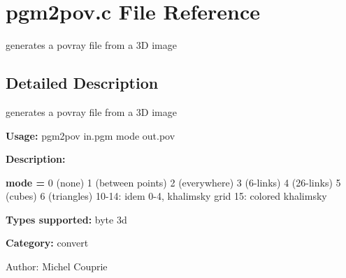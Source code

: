 \section{pgm2pov.c File Reference}
\label{pgm2pov_8c}
generates a povray file from a 3D image 



\subsection{Detailed Description}
generates a povray file from a 3D image 

{\bf Usage:} pgm2pov in.pgm mode out.pov

{\bf Description:}

{\bf mode = } 0 (none) 1 (between points) 2 (everywhere) 3 (6-links) 4 (26-links) 5 (cubes) 6 (triangles) 10-14: idem 0-4, khalimsky grid 15: colored khalimsky

{\bf Types supported:} byte 3d

{\bf Category:} convert

\begin{Desc}
\item[Author:]Michel Couprie \end{Desc}
